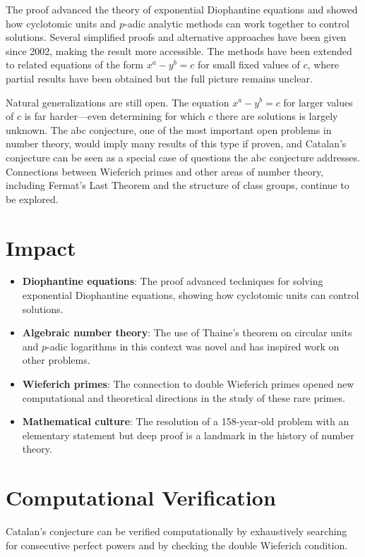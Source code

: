 The proof advanced the theory of exponential Diophantine equations and showed how cyclotomic units and $p$-adic analytic methods can work together to control solutions. Several simplified proofs and alternative approaches have been given since 2002, making the result more accessible. The methods have been extended to related equations of the form $x^a - y^b = c$ for small fixed values of $c$, where partial results have been obtained but the full picture remains unclear.

Natural generalizations are still open. The equation $x^a - y^b = c$ for larger values of $c$ is far harder---even determining for which $c$ there are solutions is largely unknown. The abc conjecture, one of the most important open problems in number theory, would imply many results of this type if proven, and Catalan's conjecture can be seen as a special case of questions the abc conjecture addresses. Connections between Wieferich primes and other areas of number theory, including Fermat's Last Theorem and the structure of class groups, continue to be explored.

\section{Impact}

\begin{itemize}
\item \textbf{Diophantine equations}: The proof advanced techniques for solving exponential Diophantine equations, showing how cyclotomic units can control solutions.
\item \textbf{Algebraic number theory}: The use of Thaine's theorem on circular units and $p$-adic logarithms in this context was novel and has inspired work on other problems.
\item \textbf{Wieferich primes}: The connection to double Wieferich primes opened new computational and theoretical directions in the study of these rare primes.
\item \textbf{Mathematical culture}: The resolution of a 158-year-old problem with an elementary statement but deep proof is a landmark in the history of number theory.
\end{itemize}

\section{Computational Verification}

Catalan's conjecture can be verified computationally by exhaustively searching for consecutive perfect powers and by checking the double Wieferich condition.

